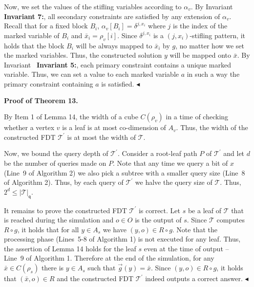 \documentclass[10pt,a4paper]{article}
\begin{document}
Now, we set the values of the stifling variables according to $\alpha_{v}$.
By Invariant \textbf{ Invariant 7:}, all secondary constraints are satisfied by any extension of $\alpha_{v}$.
Recall that for a fixed block $B_{i}$, $\alpha_{v}[B_{i}]=\delta^{j,x_{i}}$ where $j$ is the index of the marked variable of $B_{i}$ and $\bar{x}_{i}=\rho_{v}[i]$.
Since $\delta^{j,x_{i}}$ is a $(j,x_{i})$-stifling pattern, it holds that the block $B_{i}$ will be always mapped to $\bar{x}_{i}$ by $g$, no matter how we set the marked variables.
Thus, the constructed solution $y$ will be mapped onto $\bar{x}$.
By Invariant \textbf{ Invariant 5:}, each primary constraint contains a unique marked variable.
Thus, we can set a value to each marked variable $a$ in such a way the primary constraint containing $a$ is satisfied.
$\blacktriangleleft$\par





\par\medskip\noindent\textbf{Proof of Theorem 13.}\par




By Item 1 of Lemma 14, the width of a cube $C(\rho_{v})$ in a time of checking whether a vertex $v$ is a leaf is at most co-dimension of $A_{v}$.
Thus, the width of the constructed FDT $\mathcal{T}^{\prime}$ is at most the width of $\mathcal{T}$.\par




Now, we bound the query depth of $\mathcal{T}^{\prime}$.
Consider a root-leaf path $P$ of $\mathcal{T}^{\prime}$ and let $d$ be the number of queries made on $P$.
Note that any time we query a bit of $x$ (Line 9 of Algorithm 2) we also pick a subtree with a smaller query size (Line 8 of Algorithm 2).
Thus, by each query of $\mathcal{T}^{\prime}$ we halve the query size of $\mathcal{T}$.
Thus, $2^{d}\leq|\mathcal{T}|_{\mathsf{q}}$.\par




It remains to prove the constructed FDT $\mathcal{T}^{\prime}$ is correct.
Let $s$ be a leaf of $\mathcal{T}$ that is reached during the simulation and $o\in O$ is the output of $s$.
Since $\mathcal{T}$ computes $R\circ g$, it holds that for all $y\in A_{s}$ we have $(y,o)\in R\circ g$.
Note that the processing phase (Lines 5-8 of Algorithm 1) is not executed for any leaf.
Thus, the assertion of Lemma 14 holds for the leaf $s$ even at the time of output – Line 9 of Algorithm 1.
Therefore at the end of the simulation, for any $\bar{x}\in C(\rho_{s})$ there is $y\in A_{s}$ such that $\overrightarrow{g}(y)=\bar{x}$.
Since $(y,o)\in R\circ g$, it holds that $(\bar{x},o)\in R$ and the constructed FDT $\mathcal{T}^{\prime}$ indeed outputs a correct answer.
$\blacktriangleleft$\par
\end{document}
